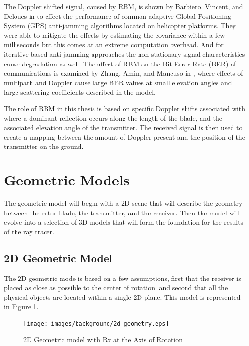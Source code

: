 The Doppler shifted signal, caused by RBM, is shown by Barbiero, Vincent, and Deloues in \cite{F.BarbieroF.VincentT.Deloues2014} to effect the performance of common adaptive Global Positioning System (GPS) anti-jamming algorithms located on helicopter platforms. They were able to mitigate the effects by estimating the covariance within a few milliseconds but this comes at an extreme computation overhead. And for iterative based anti-jamming approaches the non-stationary signal characteristics cause degradation as well. The affect of RBM on the Bit Error Rate (BER) of communications is examined by Zhang, Amin, and Mancuso in \cite{YiminZhang2000}, where effects of multipath and Doppler cause large BER values at small elevation angles and large scattering coefficients described in the model.

The role of RBM in this thesis is based on specific Doppler shifts associated with where a dominant reflection occurs along the length of the blade, and the associated elevation angle of the transmitter. The received signal is then used to create a mapping between the amount of Doppler present and the position of the transmitter on the ground.

\section{Geometric Models}
The geometric model will begin with a 2D scene that will describe the geometry between the rotor blade, the transmitter, and the receiver. Then the model will evolve into a selection of 3D models that will form the foundation for the results of the ray tracer.

\subsection{2D Geometric Model}
The 2D geometric mode is based on a few assumptions, first that the receiver is placed as close as possible to the center of rotation, and second that all the physical objects are located within a single 2D plane. This model is represented in Figure \ref{fig:2D_model}.

\begin{figure}[h]
	\begin{center}
		\texttt{[image: images/background/2d\_geometry.eps]}
		\caption{2D Geometric model with Rx at the Axis of Rotation}
		\label{fig:2D_model}
	\end{center}
\end{figure}


